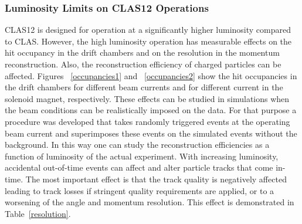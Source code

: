 \documentclass[final,3p,twocolumn]{elsarticle}
\begin{document}
\subsubsection{Luminosity Limits on CLAS12 Operations}

CLAS12 is designed for operation at a significantly higher luminosity compared to CLAS. However, the high luminosity
operation has measurable effects on the hit occupancy in the drift chambers and on the resolution in the momentum
reconstruction. Also, the reconstruction efficiency of charged particles can be affected. Figures ~\ref{occupancies1}
and ~\ref{occupancies2} show the hit occupancies in the drift chambers for different beam currents and for different
current in the solenoid magnet, respectively. These effects can be studied in simulations when the beam conditions can
be realistically imposed on the data. For that purpose a procedure was developed that takes randomly triggered events
at the operating beam current and superimposes these events on the simulated events without the background. In this
way one can study the reconstruction efficiencies as a function of luminosity of the actual experiment. With increasing
luminosity, accidental out-of-time events can affect and alter particle tracks that come in-time. The most important
effect is that the track quality is negatively affected leading to track losses if stringent quality requirements are
applied, or to a worsening of the angle and momentum resolution. This effect is demonstrated in Table~\ref{resolution}.   
\end{document}

